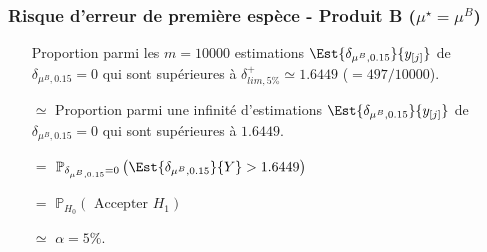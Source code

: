 \documentclass[11pt]{beamer}
\newcommand{\Sim}{{\star}}
\begin{document}
\begin{frame}
\frametitle{Risque d'erreur de première espèce - Produit B ($\mu^\Sim=\mu^B$)}
\begin{exampleblock}{}
\begin{itemize}[<+-| alert@+>]
\item[] Proportion parmi les $m=10000$ estimations $\Est{\delta_{\mu^B,0.15}}{y_{[j]}}$  de $\delta_{\mu^B,0.15}=0$ qui sont supérieures à $\delta_{lim,5\%}^+\simeq 1.6449$ ($=497/10000$). %
\item[$\simeq$] Proportion parmi une infinité d'estimations $\Est{\delta_{\mu^B,0.15}}{y_{[j]}}$  de $\delta_{\mu^B,0.15}=0$  qui sont supérieures à $1.6449$.
\item[$=$] $\mathbb{P}_{\delta_{\mu^B,0.15}=0} \left( \Est{\delta_{\mu^B,0.15}}{Y} > 1.6449\right)$
\item[$=$] $\mathbb{P}_{H_0} \left( \mbox{ Accepter } H_1\right)$
\item[$\simeq$] $\alpha=5\%$.
\end{itemize}
\end{exampleblock}
\end{frame}
\end{document}
